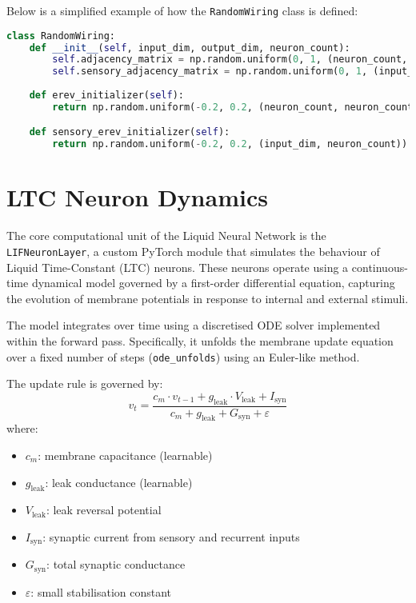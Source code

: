 \noindent Below is a simplified example of how the \texttt{RandomWiring} class is defined:
\begin{lstlisting}[language=Python, caption={Simplified RandomWiring class}]
class RandomWiring:
    def __init__(self, input_dim, output_dim, neuron_count):
        self.adjacency_matrix = np.random.uniform(0, 1, (neuron_count, neuron_count))
        self.sensory_adjacency_matrix = np.random.uniform(0, 1, (input_dim, neuron_count))
        
    def erev_initializer(self):
        return np.random.uniform(-0.2, 0.2, (neuron_count, neuron_count))

    def sensory_erev_initializer(self):
        return np.random.uniform(-0.2, 0.2, (input_dim, neuron_count))
\end{lstlisting}

\section{LTC Neuron Dynamics}
The core computational unit of the Liquid Neural Network is the \texttt{LIFNeuronLayer}, a custom PyTorch module that simulates the behaviour of Liquid Time-Constant (LTC) neurons. These neurons operate using a continuous-time dynamical model governed by a first-order differential equation, capturing the evolution of membrane potentials in response to internal and external stimuli.

The model integrates over time using a discretised ODE solver implemented within the forward pass. Specifically, it unfolds the membrane update equation over a fixed number of steps (\texttt{ode\_unfolds}) using an Euler-like method.

\noindent The update rule is governed by:
\[
v_t = \frac{c_m \cdot v_{t-1} + g_{\text{leak}} \cdot V_{\text{leak}} + I_{\text{syn}}}{c_m + g_{\text{leak}} + G_{\text{syn}} + \varepsilon}
\]
where:
\begin{itemize}
    \item $c_m$: membrane capacitance (learnable)
    \item $g_{\text{leak}}$: leak conductance (learnable)
    \item $V_{\text{leak}}$: leak reversal potential
    \item $I_{\text{syn}}$: synaptic current from sensory and recurrent inputs
    \item $G_{\text{syn}}$: total synaptic conductance
    \item $\varepsilon$: small stabilisation constant
\end{itemize}

